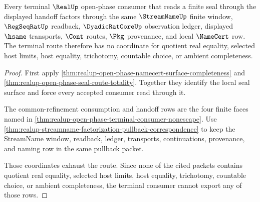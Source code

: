\begin{theorem}
\label{thm:real-open-phase-terminal-pullback-lock}
Every terminal $\RealUp$ open-phase consumer that reads a finite seal through
the displayed handoff factors through the same $\StreamNameUp$ finite window,
$\RegSeqRatUp$ readback, $\DyadicRatCoreUp$ observation ledger, displayed
$\hsame$ transports, $\Cont$ routes, $\Pkg$ provenance, and local $\NameCert$
row. The terminal route therefore has no coordinate for quotient real equality,
selected host limits, host equality, trichotomy, countable choice, or ambient
completeness.
\end{theorem}
\begin{proof}
First apply \autoref{thm:realup-open-phase-namecert-surface-completeness} and
\autoref{thm:realup-open-phase-seal-route-totality}. Together they identify
the local seal surface and force every accepted consumer read through it.

The common-refinement consumption and handoff rows are the four finite faces
named in \autoref{thm:realup-open-phase-terminal-consumer-nonescape}. Use
\autoref{thm:realup-streamname-factorization-pullback-correspondence} to keep
the StreamName window, readback, ledger, transports, continuations,
provenance, and naming row in the same pullback packet.

Those coordinates exhaust the route. Since none of the cited packets contains
quotient real equality, selected host limits, host equality, trichotomy,
countable choice, or ambient completeness, the terminal consumer cannot export
any of those rows.
\end{proof}
